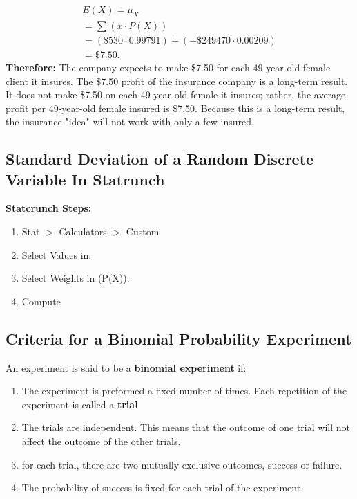 \documentclass{report}
\begin{document}
\begin{mdframed}
\begin{align*}
          E(X) = \mu_{X} \\
          = \sum (x \cdot P(X)) \\
          = (\$530 \cdot 0.99791) + (-\$249470 \cdot 0.00209) \\
          = \$7.50
      .\end{align*}
      \bigbreak \noindent 
      \textbf{Therefore:}
      \bigbreak \noindent 
      The company expects to make \$7.50 for each 49-year-old female client it insures. The \$7.50 profit of the insurance company is a long-term result. It does not make \$7.50 on each 49-year-old female it insures; rather, the average profit per 49-year-old female insured is \$7.50. Because this is a long-term result, the insurance "idea" will not work with only a few insured.
    \end{mdframed}

    \pagebreak 
    \subsection*{Standard Deviation of a Random Discrete Variable In Statrunch}
    \bigbreak \noindent 
      \textbf{Statcrunch Steps:}
      \begin{enumerate}
          \item Stat $> $ Calculators $> $ Custom
        \item Select Values in:
        \item Select Weights in (P(X)):
        \item Compute
      \end{enumerate}

      \bigbreak \noindent 
      \subsection*{Criteria for a Binomial Probability Experiment}
      \bigbreak \noindent 
        An experiment is said to be a \textbf{binomial experiment} if:
      \begin{enumerate}
          \item The experiment is preformed a fixed number of times. Each repetition of the experiment is called a \textbf{trial}
            \item The trials are independent. This means that the outcome of one trial will not affect the outcome of the other trials.
            \item for each trial, there are two mutually exclusive outcomes, success or failure.
            \item The probability of success is fixed for each trial of the experiment.
      \end{enumerate}
\end{document}
